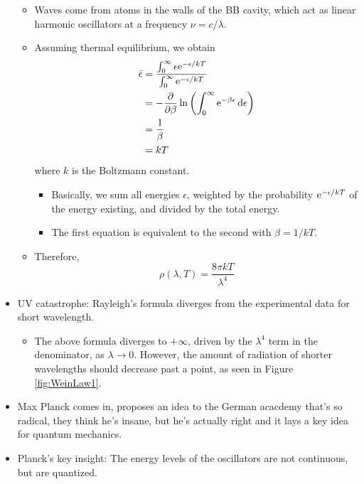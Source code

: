 \documentclass[../notes.tex]{subfiles}
\begin{document}
\begin{itemize}
\begin{itemize}
\begin{equation*}
        \end{equation*}
        \item Waves come from atoms in the walls of the BB cavity, which act as linear harmonic oscillators at a frequency $\nu=c/\lambda$.
        \item Assuming thermal equilibrium, we obtain
        \begin{align*}
            \bar{\epsilon} &= \frac{\int_0^\infty\epsilon\e[-\epsilon/kT]}{\int_0^\infty\e[-\epsilon/kT]}\\
            &= -\pdv{\beta}\ln\left( \int_0^\infty\e[-\beta\epsilon]\dd{\epsilon} \right)\\
            &= \frac{1}{\beta}\\
            &= kT
        \end{align*}
        where $k$ is the Boltzmann constant.
        \begin{itemize}
            \item Basically, we sum all energies $\epsilon$, weighted by the probability $\e[-\epsilon/kT]$ of the energy existing, and divided by the total energy.
            \item The first equation is equivalent to the second with $\beta=1/kT$.
        \end{itemize}
        \item Therefore,
        \begin{equation*}
            \rho(\lambda,T) = \frac{8\pi kT}{\lambda^4}
        \end{equation*}
    \end{itemize}
    \item UV catastrophe: Rayleigh's formula diverges from the experimental data for short wavelength.
    \begin{itemize}
        \item The above formula diverges to $+\infty$, driven by the $\lambda^4$ term in the denominator, as $\lambda\to 0$. However, the amount of radiation of shorter wavelengths should decrease past a point, as seen in Figure \ref{fig:WeinLaw1}.
    \end{itemize}
    \item Max Planck comes in, proposes an idea to the German acacdemy that's so radical, they think he's insane, but he's actually right and it lays a key idea for quantum mechanics.
    \item Planck's key insight: The energy levels of the oscillators are not continuous, but are quantized.
    \begin{itemize}

\end{itemize}
\end{itemize}
\end{document}
